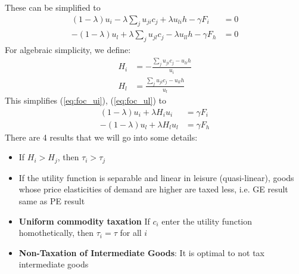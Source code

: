\documentclass[12pt]{article}
\begin{document}
	\noindent
	These can be simplified to
	\begin{align}
		(1-\lambda)u_i - \lambda \sum_j u_{ji}c_j + \lambda u_{li}h - \gamma F_i &= 0 \label{eq:foc_ui}\\
		-(1-\lambda)u_l + \lambda \sum_j u_{jl}c_j - \lambda u_{ll}h - \gamma F_h &= 0 \label{eq:foc_ul}
	\end{align}
	For algebraic simplicity, we define:
	\begin{align}
		H_i &= -\frac{\sum_j u_{ji}c_j - u_{li}h}{u_i}\\
		H_l &= \frac{\sum_j u_{jl}c_j - u_{ll}h}{u_l}
	\end{align}
	This simplifies (\ref{eq:foc_ui}), (\ref{eq:foc_ul}) to
	\begin{align}
		(1-\lambda) u_i + \lambda H_i u_i &= \gamma F_i \label{eq:foc_ui_simple}\\
		-(1-\lambda) u_l + \lambda H_l u_l &= \gamma F_h \label{eq:foc_ul_simple}
	\end{align}
	There are 4 results that we will go into some details:
	\begin{itemize}
		\item If $H_i > H_j$, then $\tau_i > \tau_j$
		\item If the utility function is separable and linear in leisure (quasi-linear), goods whose price elasticities of demand are higher are taxed less, i.e. GE result same as PE result
		\item \textbf{Uniform commodity taxation} If $c_i$ enter the utility function homothetically, then $\tau_i = \tau$ for all $i$
		\item \textbf{Non-Taxation of Intermediate Goods}: It is optimal to not tax intermediate goods
	\end{itemize}
\end{document}
